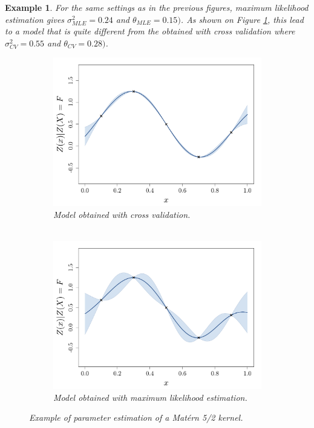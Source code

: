 \documentclass[twoside,openright]{report}
\newtheorem{example}{Example}
\begin{document}
\begin{example}
	For the same settings as in the previous figures, maximum likelihood estimation gives $\sigma^2_{MLE}=0.24 $ and $\theta_{MLE}=0.15)$. As shown on Figure \ref{fig:paramEstim}, this lead to a model that is quite different from the obtained with cross validation where $\sigma^2_{CV}=0.55 $ and $\theta_{CV}=0.28)$.
	\begin{figure}[ht!]
        \centering
        \begin{subfigure}[b]{0.44\textwidth}
                \includegraphics[width=\textwidth]{figures/ch3_CV}
                \caption{Model obtained with cross validation. \\ \ }
        \end{subfigure}%
        \hspace{1cm}       
        \begin{subfigure}[b]{0.44\textwidth}
                \includegraphics[width=\textwidth]{figures/ch3_MLE}
                \caption{Model obtained with maximum likelihood estimation.}
        \end{subfigure}
        \caption{Example of parameter estimation of a Mat\' ern 5/2 kernel.}
        \label{fig:paramEstim}
	\end{figure}
\end{example}
\end{document}
